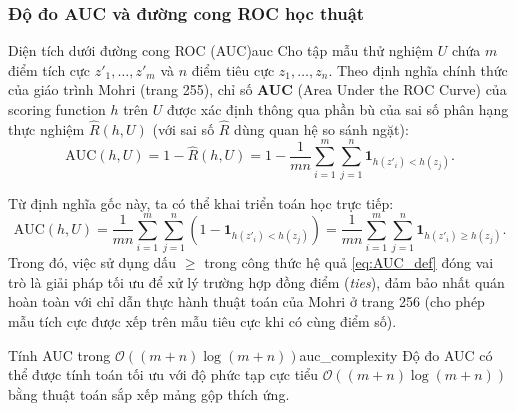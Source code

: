 \subsubsection{Độ đo AUC và đường cong ROC học thuật}

\begin{definition}{Diện tích dưới đường cong ROC (AUC)}{auc}
Cho tập mẫu thử nghiệm $U$ chứa $m$ điểm tích cực $z'_1, \ldots, z'_m$ và $n$ điểm tiêu cực $z_1, \ldots, z_n$. Theo định nghĩa chính thức của giáo trình Mohri (trang 255), chỉ số \textbf{AUC} (Area Under the ROC Curve) của scoring function $h$ trên $U$ được xác định thông qua phần bù của sai số phân hạng thực nghiệm $\hat{R}(h, U)$ (với sai số $\hat{R}$ dùng quan hệ so sánh ngặt):
\begin{equation}
    \mathrm{AUC}(h, U) = 1 - \hat{R}(h, U) = 1 - \frac{1}{mn} \sum_{i=1}^m \sum_{j=1}^n \mathbf{1}_{h(z'_i) < h(z_j)}.
    \label{eq:AUC_official}
\end{equation}

Từ định nghĩa gốc này, ta có thể khai triển toán học trực tiếp:
\begin{equation}
    \mathrm{AUC}(h, U) = \frac{1}{mn} \sum_{i=1}^m \sum_{j=1}^n \left( 1 - \mathbf{1}_{h(z'_i) < h(z_j)} \right) = \frac{1}{mn} \sum_{i=1}^m \sum_{j=1}^n \mathbf{1}_{h(z'_i) \geq h(z_j)}.
    \label{eq:AUC_def}
\end{equation}
Trong đó, việc sử dụng dấu $\geq$ trong công thức hệ quả \eqref{eq:AUC_def} đóng vai trò là giải pháp tối ưu để xử lý trường hợp đồng điểm (\textit{ties}), đảm bảo nhất quán hoàn toàn với chỉ dẫn thực hành thuật toán của Mohri ở trang 256 (cho phép mẫu tích cực được xếp trên mẫu tiêu cực khi có cùng điểm số).
\end{definition}

\begin{theorem}{Tính AUC trong $\mathcal{O}((m+n)\log(m+n))$}{auc_complexity}
Độ đo AUC có thể được tính toán tối ưu với độ phức tạp cực tiểu $\mathcal{O}((m+n)\log(m+n))$ bằng thuật toán sắp xếp mảng gộp thích ứng.
\end{theorem}


